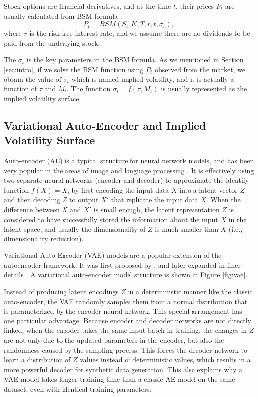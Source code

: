 \documentclass[format=sigconf]{acmart}
\begin{document}
Stock options are financial derivatives, and at the time $t$, their prices $P_{t}$ are usually calculated from BSM formula \cite{davis2010black}:  
\begin{equation*} 
\label{eq:bsm}
P_{t} = BSM(S_{t}, K, T, r, t, \sigma_{t}),
\end{equation*}
where $r$ is the risk-free interest rate, and we assume there are no dividends to be paid from the underlying stock.

The $\sigma_{t}$ is the key parameters in the BSM formula. As we mentioned in Section \ref{sec:intro}, if we solve the BSM function using $P_{t}$ observed from the market, we obtain the value of $\sigma_{t}$ which is named implied volatility, and it is actually a function of $\tau$ and $M_{t}$. The function $\sigma_{t} = f(\tau, M_{t})$ is usually represented as the implied volatility surface.

\subsection{Variational Auto-Encoder and Implied Volatility Surface}
Auto-encoder (AE) is a typical structure for neural network models, and has been very popular in the areas of image and language processing \cite{zhang2018better,chen2017kate}. It is effectively using two separate neural networks (encoder and decoder) to approximate the identify function $f(X) = X$, by first encoding the input data $X$ into a latent vector $Z$ and then decoding $Z$ to output $X'$ that replicate the input data $X$. When the difference between $X$ and $X'$ is small enough, the latent representation $Z$ is considered to have successfully stored the information about the input $X$ in the latent space, and usually the dimensionality of $Z$ is much smaller than $X$ (i.e., dimensionality reduction). %

Variational Auto-Encoder (VAE) models are a popular extension of the autoencoder framework. It was first proposed by %
\cite{kingma2013auto}, and %
later expanded %
in finer details \cite{kingma2019introduction}. A variational auto-encoder model structure is shown in Figure \ref{fig:vae}. 

Instead of producing latent encodings $Z$ in a deterministic manner like the classic auto-encoder, the VAE randomly samples them from a normal distribution that is parameterized by the encoder neural network. This special arrangement has one particular advantage. %
Because encoder and decoder networks are not directly linked, when the encoder takes the same input batch in training, the changes in $Z$ are not only due to the updated parameters in the encoder, but also the randomness caused by the sampling process. This forces the decoder network to learn a distribution of $Z$ values instead of deterministic values, which results in a more powerful decoder for synthetic data generation. This also %
explains why a VAE model %
takes longer training time than a classic AE model on the same dataset, even with identical training parameters. 
\end{document}
